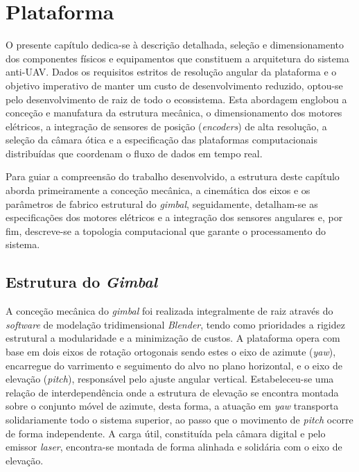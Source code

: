 
\chapter{Plataforma} %
\label{chap:Chapter5} %


O presente capítulo dedica-se à descrição detalhada, seleção e dimensionamento dos componentes físicos e equipamentos que constituem a arquitetura do sistema anti-\ac{UAV}. Dados os requisitos estritos de resolução angular da plataforma e o objetivo imperativo de manter um custo de desenvolvimento reduzido, optou-se pelo desenvolvimento de raiz de todo o ecossistema. Esta abordagem englobou a conceção e manufatura da estrutura mecânica, o dimensionamento dos motores elétricos, a integração de sensores de posição (\emph{encoders}) de alta resolução, a seleção da câmara ótica e a especificação das plataformas computacionais distribuídas que coordenam o fluxo de dados em tempo real.

Para guiar a compreensão do trabalho desenvolvido, a estrutura deste capítulo aborda primeiramente a conceção mecânica, a cinemática dos eixos e os parâmetros de fabrico estrutural do \emph{gimbal}, seguidamente, detalham-se as especificações dos motores elétricos e a integração dos sensores angulares e, por fim, descreve-se a topologia computacional que garante o processamento do sistema.

\section{Estrutura do \emph{Gimbal}}

A conceção mecânica do \emph{gimbal} foi realizada integralmente de raiz através do \emph{software} de modelação tridimensional \emph{Blender}, tendo como prioridades a rigidez estrutural a modularidade e a minimização de custos. A plataforma opera com base em dois eixos de rotação ortogonais sendo estes o eixo de azimute (\emph{yaw}), encarregue do varrimento e seguimento do alvo no plano horizontal, e o eixo de elevação (\emph{pitch}), responsável pelo ajuste angular vertical. Estabeleceu-se uma relação de interdependência onde a estrutura de elevação se encontra montada sobre o conjunto móvel de azimute, desta forma, a atuação em \emph{yaw} transporta solidariamente todo o sistema superior, ao passo que o movimento de \emph{pitch} ocorre de forma independente. A carga útil, constituída pela câmara digital e pelo emissor \emph{laser}, encontra-se montada de forma alinhada e solidária com o eixo de elevação. 

